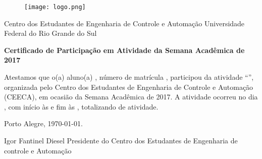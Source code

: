 \begin{landscape}
\centering
\begin{figure}
\centering
\texttt{[image: logo.png]}
\end{figure}
Centro dos Estudantes de Engenharia de Controle e Automação
Universidade Federal do Rio Grande do Sul

\textbf{Certificado de Participação em Atividade da Semana Acadêmica de 2017}

\justify
	Atestamos que o(a) aluno(a) \NOME{}, número de matrícula \NUMERO{}, participou da atividade “\ATIVIDADE{}”, organizada pelo Centro dos Estudantes de Engenharia de Controle e Automação (CEECA), em ocasião da Semana Acadêmica de 2017. A atividade ocorreu no dia \DIA{}, com início às \HINICIO{} e fim às \HFIM{}, totalizando \DURACAO{} de atividade.

\centering
Porto Alegre, \today.


Igor Fantinel Diesel
Presidente do Centro dos Estudantes de Engenharia de controle e Automação
\end{landscape}
